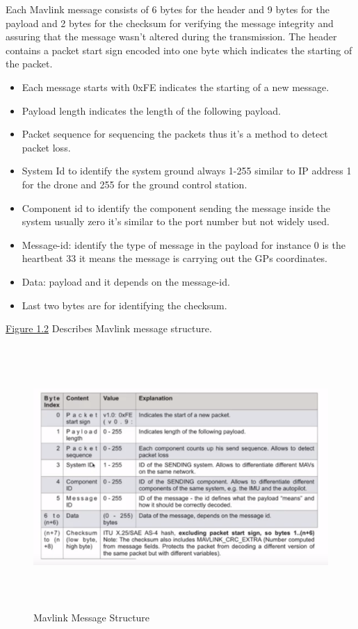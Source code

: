 Each Mavlink message consists of 6 bytes for the header and 9 bytes for the payload and 2 bytes for the checksum for verifying the message integrity and assuring that the message wasn’t altered during the transmission. The header contains a packet start sign encoded into one byte which indicates the starting of the packet.
\begin{itemize}
  \item Each message starts with 0xFE indicates the starting of a new message.
  \item Payload length indicates the length of the following payload.
  \item Packet sequence for sequencing the packets thus it’s a method to detect packet loss.
\item System Id to identify the system ground always 1-255 similar to IP address 1 for the drone and 255 for the ground control station.
\item Component id to identify the component sending the message inside the system usually zero it’s similar to the port number but not widely used.
\item Message-id: identify the type of message in the payload for instance 0 is the heartbeat 33 it means the message is carrying out the GPs coordinates.
\item Data: payload and it depends on the message-id.
\item Last two bytes are for identifying the checksum.
\end{itemize}

\hyperref[fig:Mavlinkmessage]{Figure 1.2} Describes Mavlink message structure. 
 \begin{figure}[H]
\includegraphics[width=15cm,height=10cm]{images/2.png}
\caption{Mavlink Message Structure }
\label{fig:Mavlinkmessage}
\end{figure}


